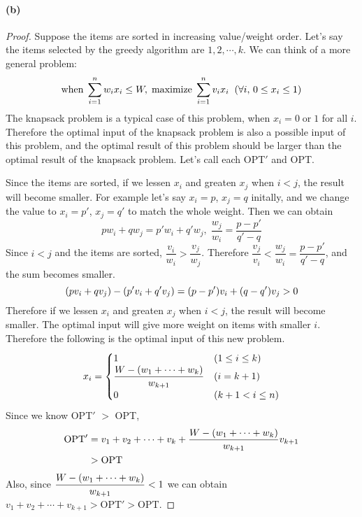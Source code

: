 \documentclass[10pt]{article}
\begin{document}
\paragraph{(b)}
\begin{proof}
    Suppose the items are sorted in increasing value/weight order. Let's say the items selected by the greedy algorithm are $1, 2, \cdots, k$.
    We can think of a more general problem:
    $$\textrm{when} \; \sum_{i=1}^{n}w_ix_i \leq W, \; \textrm{maximize} \; \sum_{i=1}^{n}v_ix_i \;\; \qty(\forall i, \, 0 \leq x_i \leq 1)$$
    The knapsack problem is a typical case of this problem, when $x_i = 0 \; \textrm{or} \; 1$ for all $i$. 
    Therefore the optimal input of the knapsack problem is also a possible input of this problem, and the optimal result of this problem should be larger than the optimal result of the knapsack problem.
    Let's call each OPT$'$ and OPT.

    \vspace{0.3cm} Since the items are sorted, if we lessen $x_i$ and greaten $x_j$ when $i < j$, the result will become smaller.
    For example let's say $x_i = p$, $x_j=q$ initally, and we change the value to $x_i = p'$, $x_j = q'$ to match the whole weight. 
    Then we can obtain
    $$pw_i + qw_j = p'w_i + q'w_j, \; \frac{w_j}{w_i} = \frac{p-p'}{q'-q}$$
    Since $i<j$ and the items are sorted, $\dfrac{v_i}{w_i} > \dfrac{v_j}{w_j}$. Therefore $\dfrac{v_j}{v_i} < \dfrac{w_j}{w_i} = \dfrac{p-p'}{q'-q}$, and the sum becomes smaller.
    $$\qty(pv_i + qv_j) - \qty(p'v_i + q'v_j) = \qty(p-p')v_i + (q-q')v_j > 0$$
    Therefore if we lessen $x_i$ and greaten $x_j$ when $i < j$, the result will become smaller. The optimal input will give more weight on items with smaller $i$.
    Therefore the following is the optimal input of this new problem. 
    \begin{equation*}
        x_i = \begin{cases}
            1 &(1 \leq i \leq k) \\
            \dfrac{W - \qty(w_1 + \cdots + w_k)}{w_{k+1}} &(i = k+1) \\
            0 &(k+1 < i \leq n)
        \end{cases}
    \end{equation*}
    Since we know OPT$'$ $>$ OPT,
    \begin{align*}
        \textrm{OPT}' &= v_1 + v_2 + \cdots + v_k + \frac{W - \qty(w_1 + \cdots + w_k)}{w_{k+1}}v_{k+1} \\
        &> \textrm{OPT}
    \end{align*}
    Also, since $\dfrac{W - \qty(w_1 + \cdots + w_k)}{w_{k+1}} < 1$ we can obtain $v_1 + v_2 + \cdots + v_{k+1} > \textrm{OPT}' > \textrm{OPT}$.


\end{proof}
\end{document}
